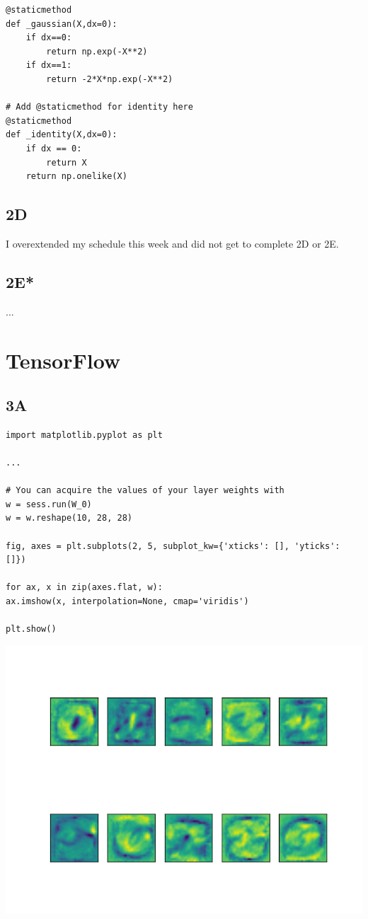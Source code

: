 \documentclass[12pt]{article}
\begin{document}
\begin{flushleft}
\begin{lstlisting}
@staticmethod
def _gaussian(X,dx=0):
	if dx==0:
		return np.exp(-X**2)
	if dx==1:
		return -2*X*np.exp(-X**2)

# Add @staticmethod for identity here
@staticmethod
def _identity(X,dx=0):
	if dx == 0:
		return X 
	return np.onelike(X)

		\end{lstlisting}
		
		\subsection*{2D}
		I overextended my schedule this week and did not get to complete 2D or 2E.
		
		\subsection*{2E*}
		...
		
		\section{TensorFlow}
		
		\subsection*{3A}
		\begin{lstlisting}
import matplotlib.pyplot as plt

...

# You can acquire the values of your layer weights with
w = sess.run(W_0)
w = w.reshape(10, 28, 28)

fig, axes = plt.subplots(2, 5, subplot_kw={'xticks': [], 'yticks': []})

for ax, x in zip(axes.flat, w):
ax.imshow(x, interpolation=None, cmap='viridis')

plt.show()

		\end{lstlisting}
		
		\includegraphics[scale=0.5]{HW2_3A.png}
		\label{fig:graph 3A}
		

\end{flushleft}
\end{document}
